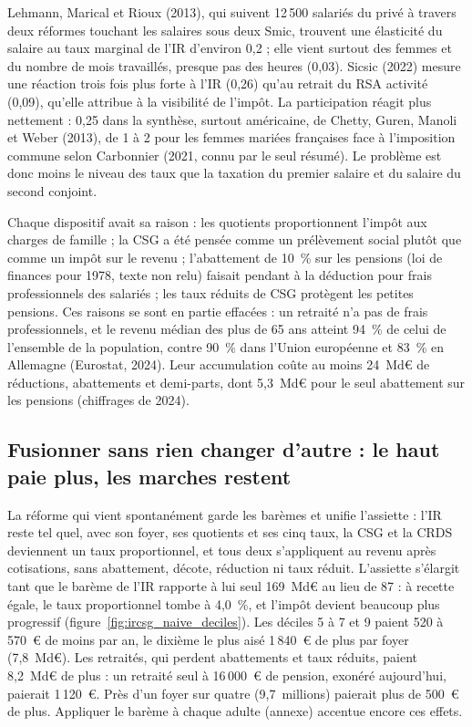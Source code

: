 \documentclass[11pt,a4paper]{article}
\begin{document}
Lehmann, Marical et Rioux (2013), qui suivent 12\,500 salariés du privé à travers deux réformes touchant les salaires
sous deux Smic, trouvent une élasticité du salaire au taux marginal de l'IR d'environ 0,2 ; elle vient surtout des
femmes et du nombre de mois travaillés, presque pas des heures (0,03). Sicsic (2022) mesure une réaction trois fois plus
forte à l'IR (0,26) qu'au retrait du RSA activité (0,09), qu'elle attribue à la visibilité de l'impôt. La participation
réagit plus nettement : 0,25 dans la synthèse, surtout américaine, de Chetty, Guren, Manoli et Weber (2013), de 1 à 2
pour les femmes mariées françaises face à l'imposition commune selon Carbonnier (2021, connu par le seul résumé). Le
problème est donc moins le niveau des taux que la taxation du premier salaire et du salaire du second conjoint.

Chaque dispositif avait sa raison : les quotients proportionnent l'impôt aux charges de famille ; la CSG a été pensée
comme un prélèvement social plutôt que comme un impôt sur le revenu ; l'abattement de 10~\% sur les pensions (loi de
finances pour 1978, texte non relu) faisait pendant à la déduction pour frais professionnels des salariés ; les taux
réduits de CSG protègent les petites pensions. Ces raisons se sont en partie effacées : un retraité n'a pas de frais
professionnels, et le revenu médian des plus de 65 ans atteint 94~\% de celui de l'ensemble de la population, contre
90~\% dans l'Union européenne et 83~\% en Allemagne (Eurostat, 2024). Leur accumulation coûte au moins 24~Md€ de
réductions, abattements et demi-parts, dont 5,3~Md€ pour le seul abattement sur les pensions (chiffrages de 2024).

\subsection{Fusionner sans rien changer d'autre : le haut paie plus, les marches restent}

La réforme qui vient spontanément garde les barèmes et unifie l'assiette : l'IR reste tel quel, avec son foyer, ses
quotients et ses cinq taux, la CSG et la CRDS deviennent un taux proportionnel, et tous deux s'appliquent au revenu
après cotisations, sans abattement, décote, réduction ni taux réduit. L'assiette s'élargit tant que le barème de l'IR
rapporte à lui seul 169~Md€ au lieu de 87 : à recette égale, le taux proportionnel tombe à 4,0~\%, et l'impôt devient
beaucoup plus progressif (figure~\ref{fig:ircsg_naive_deciles}). Les déciles 5 à 7 et 9 paient 520 à 570~€ de moins par
an, le dixième le plus aisé 1\,840~€ de plus par foyer (7,8~Md€). Les retraités, qui perdent abattements et taux
réduits, paient 8,2~Md€ de plus : un retraité seul à 16\,000~€ de pension, exonéré aujourd'hui, paierait 1\,120~€. Près
d'un foyer sur quatre (9,7~millions) paierait plus de 500~€ de plus. Appliquer le barème à chaque adulte (annexe)
accentue encore ces effets.
\end{document}
